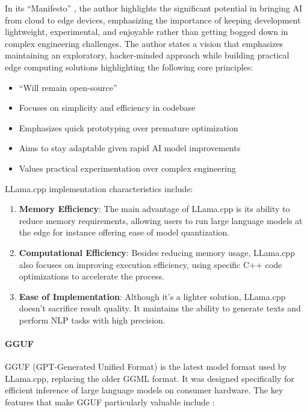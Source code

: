 In its ``Manifesto'' , the author highlights the significant potential in bringing AI from cloud to edge devices, emphasizing the importance of keeping development lightweight, experimental, and enjoyable rather than getting bogged down in complex engineering challenges. The author states a vision that emphasizes maintaining an exploratory, hacker-minded approach while building practical edge computing solutions highlighting the following core principles:

\begin{itemize}
    \item ``Will remain open-source''
    \item Focuses on simplicity and efficiency in codebase
    \item Emphasizes quick prototyping over premature optimization
    \item Aims to stay adaptable given rapid AI model improvements
    \item Values practical experimentation over complex engineering
\end{itemize}

LLama.cpp implementation characteristics include:

\begin{enumerate}
    \item \textbf{Memory Efficiency}: The main advantage of LLama.cpp is its ability to reduce memory requirements, allowing users to run large language models at the edge for instance offering ease of model quantization.

    \item \textbf{Computational Efficiency}: Besides reducing memory usage, LLama.cpp also focuses on improving execution efficiency, using specific C++ code optimizations to accelerate the process.

    \item \textbf{Ease of Implementation}: Although it's a lighter solution, LLama.cpp doesn't sacrifice result quality. It maintains the ability to generate texts and perform NLP tasks with high precision.
\end{enumerate}

\paragraph{GGUF}

GGUF (GPT-Generated Unified Format)  is the latest model format used by LLama.cpp, replacing the older GGML format. It was designed specifically for efficient inference of large language models on consumer hardware. The key features that make GGUF particularly valuable include :

